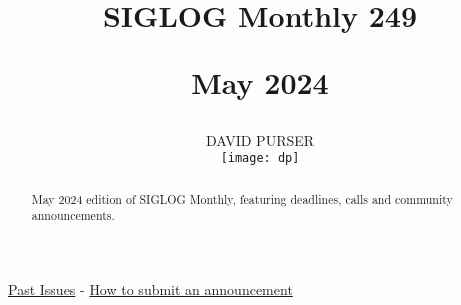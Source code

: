 \documentclass[prodmode,acmtecs]{acmsmall} %
\newcounter{colstart}
\begin{document}
\setcounter{colstart}{\thepage}

\title{{\huge\sc SIGLOG Monthly 249}

 May 2024}
\author{DAVID PURSER
\vspace*{-2.6cm}\begin{flushright}\texttt{[image: dp]}\end{flushright}
}

\begin{abstract}
May 2024 edition of SIGLOG Monthly, featuring deadlines, calls and community announcements.
\end{abstract}


\maketitlee

\href{https://lics.siglog.org/newsletters/}{Past Issues}
 - 
\href{https://lics.siglog.org/newsletters/inst.html}{How to submit an announcement}
\end{document}
